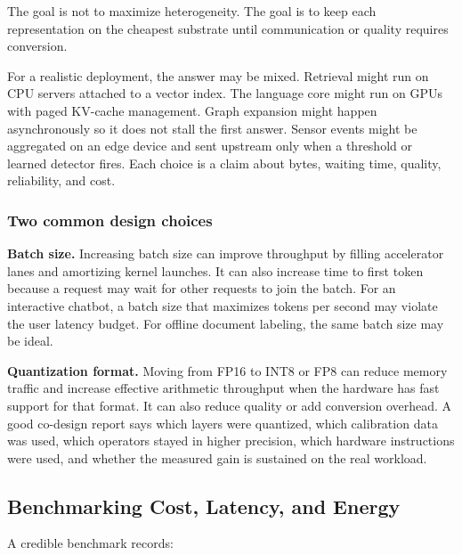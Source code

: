The goal is not to maximize heterogeneity. The goal is to keep each representation on the cheapest substrate until communication or quality requires conversion.

For a realistic deployment, the answer may be mixed. Retrieval might run on CPU servers attached to a vector index. The language core might run on GPUs with paged KV-cache management. Graph expansion might happen asynchronously so it does not stall the first answer. Sensor events might be aggregated on an edge device and sent upstream only when a threshold or learned detector fires. Each choice is a claim about bytes, waiting time, quality, reliability, and cost.

\subsubsection{Two common design choices}

\textbf{Batch size.} Increasing batch size can improve throughput by filling accelerator lanes and amortizing kernel launches. It can also increase time to first token because a request may wait for other requests to join the batch. For an interactive chatbot, a batch size that maximizes tokens per second may violate the user latency budget. For offline document labeling, the same batch size may be ideal.

\textbf{Quantization format.} Moving from FP16 to INT8 or FP8 can reduce memory traffic and increase effective arithmetic throughput when the hardware has fast support for that format. It can also reduce quality or add conversion overhead. A good co-design report says which layers were quantized, which calibration data was used, which operators stayed in higher precision, which hardware instructions were used, and whether the measured gain is sustained on the real workload.

\subsection{Benchmarking Cost, Latency, and Energy}

A credible benchmark records:

